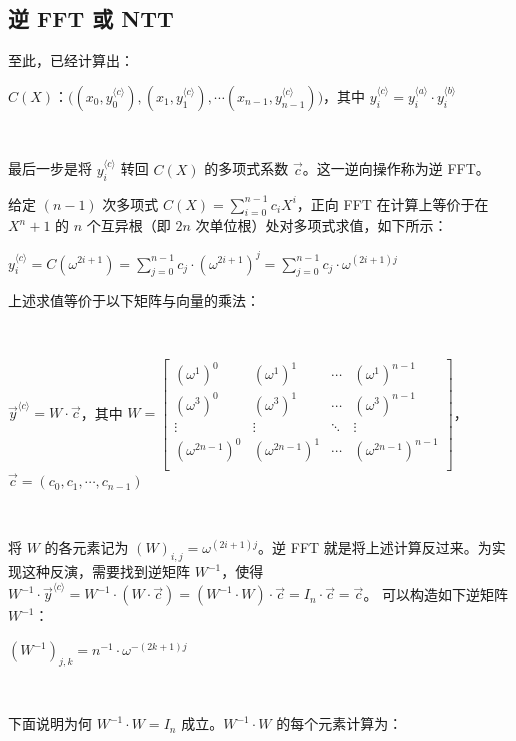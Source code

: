 \subsection{逆 FFT 或 NTT}
\label{subsec:ntt-backward}

至此，已经计算出：

$C(X)$：$\bm ( ({x}_0, {y}_0^{\langle c \rangle}), ({x}_1, {y}_1^{\langle c \rangle}), \cdots ({x}_{n-1}, {y}_{n-1}^{\langle c \rangle}) \bm )$，其中 ${y}_i^{\langle c \rangle} = {y}_i^{\langle a \rangle} \cdot {y}_i^{\langle b \rangle}$

$ $

最后一步是将 ${y}_i^{\langle c \rangle}$ 转回 $C(X)$ 的多项式系数 $\vec{c}$。这一逆向操作称为逆 FFT。

给定 $(n-1)$ 次多项式
$C(X) = \sum\limits_{i=0}^{n-1}c_iX^i$，正向 FFT 在计算上等价于在 $X^n + 1$ 的 $n$ 个互异根（即 $2n$ 次单位根）处对多项式求值，如下所示：

${y}_i^{\langle c \rangle} = C(\omega^{2i+1}) = \sum\limits_{j=0}^{n-1}c_{j}\cdot (\omega^{2i + 1})^j = \sum\limits_{j=0}^{n-1}c_{j}\cdot \omega^{(2i+1)j}$

上述求值等价于以下矩阵与向量的乘法：

$ $



$\vec y^{\langle c \rangle} = W \cdot \vec{c}$，\text{ }其中 $W = \begin{bmatrix}
(\omega^1)^0 & (\omega^1)^1 & \cdots & (\omega^1)^{n-1}\\
(\omega^3)^0 & (\omega^3)^1 & \cdots & (\omega^3)^{n-1}\\
\vdots & \vdots & \ddots & \vdots \\
(\omega^{2n-1})^0 & (\omega^{2n-1})^1 & \cdots & (\omega^{2n-1})^{n-1}\\
\end{bmatrix} $，\text{ }$\vec{c} = (c_0, c_1, \cdots, c_{n-1})$

$ $

将 $W$ 的各元素记为 $(W)_{i,j} = \omega^{(2i+1)j}$。逆 FFT 就是将上述计算反过来。为实现这种反演，需要找到逆矩阵 $W^{-1}$，使得 $W^{-1} \cdot \vec y^{\langle c \rangle} = W^{-1} \cdot (W \cdot \vec{c}) = (W^{-1} \cdot W) \cdot \vec{c} = I_n \cdot \vec{c} =  \vec{c}$。
可以构造如下逆矩阵 $W^{-1}$：

$(W^{-1})_{j,k} = n^{-1}\cdot \omega^{-(2k+1)j}$

$ $

下面说明为何 $W^{-1} \cdot W = I_n$ 成立。$W^{-1} \cdot W$ 的每个元素计算为：

